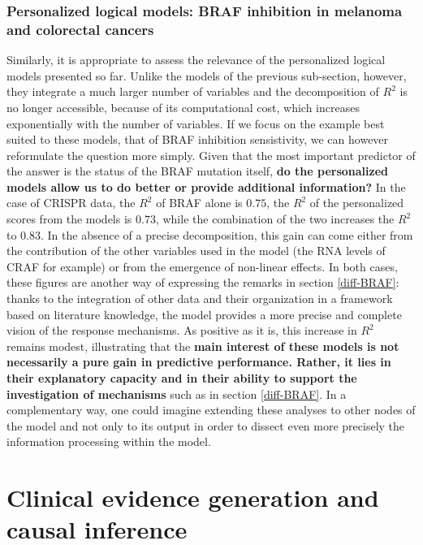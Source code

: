 \documentclass[a4paper,12pt,twoside,onecolumn,openright,final,oldfontcommands]{memoir}
\begin{document}
\subsection{Personalized logical models: BRAF inhibition in melanoma and
colorectal
cancers}\label{personalized-logical-models-braf-inhibition-in-melanoma-and-colorectal-cancers}

Similarly, it is appropriate to assess the relevance of the personalized
logical models presented so far. Unlike the models of the previous
sub-section, however, they integrate a much larger number of variables
and the decomposition of \(R^2\) is no longer accessible, because of its
computational cost, which increases exponentially with the number of
variables. If we focus on the example best suited to these models, that
of BRAF inhibition sensistivity, we can however reformulate the question
more simply. Given that the most important predictor of the answer is
the status of the BRAF mutation itself, \textbf{do the personalized
models allow us to do better or provide additional information?} In the
case of CRISPR data, the \(R^2\) of BRAF alone is \(0.75\), the \(R^2\)
of the personalized scores from the models is \(0.73\), while the
combination of the two increases the \(R^2\) to \(0.83\). In the absence
of a precise decomposition, this gain can come either from the
contribution of the other variables used in the model (the RNA levels of
CRAF for example) or from the emergence of non-linear effects. In both
cases, these figures are another way of expressing the remarks in
section \ref{diff-BRAF}: thanks to the integration of other data and
their organization in a framework based on literature knowledge, the
model provides a more precise and complete vision of the response
mechanisms. As positive as it is, this increase in \(R^2\) remains
modest, illustrating that the \textbf{main interest of these models is
not necessarily a pure gain in predictive performance. Rather, it lies
in their explanatory capacity and in their ability to support the
investigation of mechanisms} such as in section \ref{diff-BRAF}. In a
complementary way, one could imagine extending these analyses to other
nodes of the model and not only to its output in order to dissect even
more precisely the information processing within the model.

\chapter{Clinical evidence generation and causal
inference}\label{clinical-evidence-generation-and-causal-inference}
\end{document}
